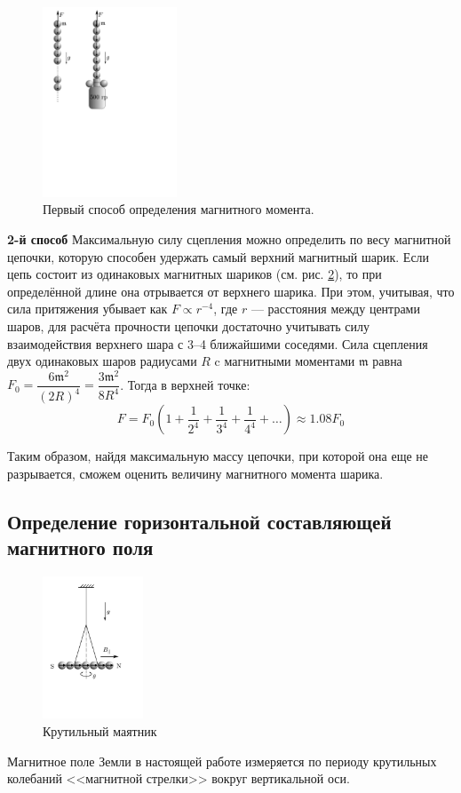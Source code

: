 \documentclass[12pt, a4paper]{article}
\newcommand{\m}{\mathfrak{m}}
\begin{document}
\begin{figure}\vspace{-19mm}
\centering
	\includegraphics[width=4cm]{pics/m_chain.pdf}
	\caption{Первый способ определения магнитного момента.}
	\label{m_chain}
\end{figure}
\textbf{2-й способ} Максимальную силу сцепления можно определить по весу магнитной цепочки, кото­рую способен удержать самый верхний маг­нитный шарик. Если цепь состоит из одина­ковых магнитных шариков (см. рис. \ref{m_chain}), то при определённой длине она отрывается от верхнего шарика. При этом, учитывая, что
сила притяжения убывает как $F \propto r^{-4}$, где $r$ — расстояния между центрами шаров, для расчёта прочности цепочки достаточно учи­тывать силу взаимодействия верхнего шара с 3–4 ближайшими соседями. Сила сцепления двух одинаковых шаров радиусами $R$ c магнит­ными моментами $\m$ равна
$F_0 = \dfrac{6\m^2}{(2R)^4}=\dfrac{3\m^2}{8R^4}$. Тогда в верхней точке:
\begin{equation}
F = F_0 \left( 1 + \frac{1}{2^4} + \frac{1}{3^4} + \frac{1}{4^4} + \dots \right) \approx 1.08 F_0
\label{f0}
\end{equation}

Таким образом, найдя максимальную массу цепочки, при которой она еще не разрывается, сможем оценить величину магнитного момента шарика.

\subsection{Определение горизонтальной составляющей магнитного поля}
\begin{figure}\vspace{-5mm}
\centering
	\includegraphics[width=3cm]{pics/b_par.pdf}
	\caption{Крутильный маятник}
	\label{m_chain}
\end{figure}
Магнитное поле Земли в настоящей работе измеряется по периоду
крутильных колебаний <<магнитной стрелки>> вокруг вертикальной оси.
\end{document}
